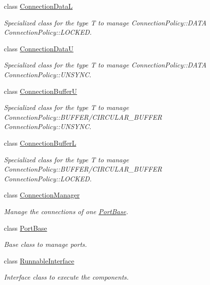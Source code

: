 \begin{DoxyCompactItemize}
class \hyperlink{classcoco_1_1_connection_data_l}{Connection\-Data\-L}
\begin{DoxyCompactList}\small\item\em Specialized class for the type T to manage Connection\-Policy\-::\-D\-A\-T\-A Connection\-Policy\-::\-L\-O\-C\-K\-E\-D. \end{DoxyCompactList}\item 
class \hyperlink{classcoco_1_1_connection_data_u}{Connection\-Data\-U}
\begin{DoxyCompactList}\small\item\em Specialized class for the type T to manage Connection\-Policy\-::\-D\-A\-T\-A Connection\-Policy\-::\-U\-N\-S\-Y\-N\-C. \end{DoxyCompactList}\item 
class \hyperlink{classcoco_1_1_connection_buffer_u}{Connection\-Buffer\-U}
\begin{DoxyCompactList}\small\item\em Specialized class for the type T to manage Connection\-Policy\-::\-B\-U\-F\-F\-E\-R/\-C\-I\-R\-C\-U\-L\-A\-R\-\_\-\-B\-U\-F\-F\-E\-R Connection\-Policy\-::\-U\-N\-S\-Y\-N\-C. \end{DoxyCompactList}\item 
class \hyperlink{classcoco_1_1_connection_buffer_l}{Connection\-Buffer\-L}
\begin{DoxyCompactList}\small\item\em Specialized class for the type T to manage Connection\-Policy\-::\-B\-U\-F\-F\-E\-R/\-C\-I\-R\-C\-U\-L\-A\-R\-\_\-\-B\-U\-F\-F\-E\-R Connection\-Policy\-::\-L\-O\-C\-K\-E\-D. \end{DoxyCompactList}\item 
class \hyperlink{classcoco_1_1_connection_manager}{Connection\-Manager}
\begin{DoxyCompactList}\small\item\em Manage the connections of one \hyperlink{classcoco_1_1_port_base}{Port\-Base}. \end{DoxyCompactList}\item 
class \hyperlink{classcoco_1_1_port_base}{Port\-Base}
\begin{DoxyCompactList}\small\item\em Base class to manage ports. \end{DoxyCompactList}\item 
class \hyperlink{classcoco_1_1_runnable_interface}{Runnable\-Interface}
\begin{DoxyCompactList}\small\item\em Interface class to execute the components. \end{DoxyCompactList}\item 

\end{DoxyCompactItemize}
